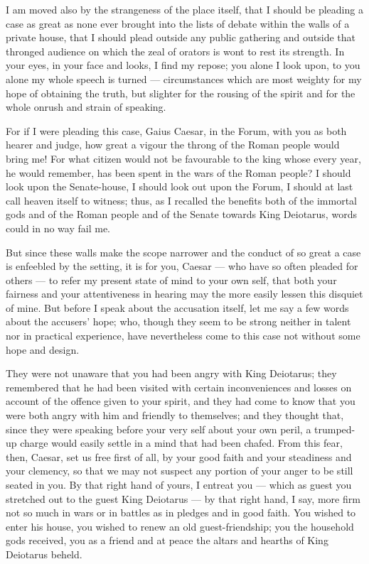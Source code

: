  I am moved also by the strangeness of the place itself, that I should be pleading a case as great as none ever brought into the lists of debate within the walls of a private house, that I should plead outside any public gathering and outside that thronged audience on which the zeal of orators is wont to rest its strength. In your eyes, in your face and looks, I find my repose; you alone I look upon, to you alone my whole speech is turned --- circumstances which are most weighty for my hope of obtaining the truth, but slighter for the rousing of the spirit and for the whole onrush and strain of speaking.

 For if I were pleading this case, Gaius Caesar, in the Forum, with you as both hearer and judge, how great a vigour the throng of the Roman people would bring me! For what citizen would not be favourable to the king whose every year, he would remember, has been spent in the wars of the Roman people? I should look upon the Senate-house, I should look out upon the Forum, I should at last call heaven itself to witness; thus, as I recalled the benefits both of the immortal gods and of the Roman people and of the Senate towards King Deiotarus, words could in no way fail me.

 But since these walls make the scope narrower and the conduct of so great a case is enfeebled by the setting, it is for you, Caesar --- who have so often pleaded for others --- to refer my present state of mind to your own self, that both your fairness and your attentiveness in hearing may the more easily lessen this disquiet of mine. But before I speak about the accusation itself, let me say a few words about the accusers' hope; who, though they seem to be strong neither in talent nor in practical experience, have nevertheless come to this case not without some hope and design.

 They were not unaware that you had been angry with King Deiotarus; they remembered that he had been visited with certain inconveniences and losses on account of the offence given to your spirit, and they had come to know that you were both angry with him and friendly to themselves; and they thought that, since they were speaking before your very self about your own peril, a trumped-up charge would easily settle in a mind that had been chafed. From this fear, then, Caesar, set us free first of all, by your good faith and your steadiness and your clemency, so that we may not suspect any portion of your anger to be still seated in you. By that right hand of yours, I entreat you --- which as guest you stretched out to the guest King Deiotarus --- by that right hand, I say, more firm not so much in wars or in battles as in pledges and in good faith. You wished to enter his house, you wished to renew an old guest-friendship; you the household gods received, you as a friend and at peace the altars and hearths of King Deiotarus beheld.

